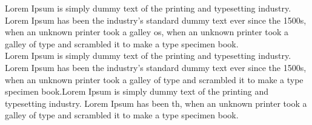 \documentclass[12pt,a4paper]{article}
\begin{document}
Lorem Ipsum is simply dummy text of the printing and typesetting industry. Lorem Ipsum has been the industry's standard dummy text ever since the 1500s, when an unknown printer took a galley os, when an unknown printer took a galley of type and scrambled it to make a type specimen book.\\

Lorem Ipsum is simply dummy text of the printing and typesetting industry. Lorem Ipsum has been the industry's standard dummy text ever since the 1500s, when an unknown printer took a galley of type and scrambled it to make a type specimen book.Lorem Ipsum is simply dummy text of the printing and typesetting industry. Lorem Ipsum has been th, when an unknown printer took a galley of type and scrambled it to make a type specimen book.\\
\end{document}
